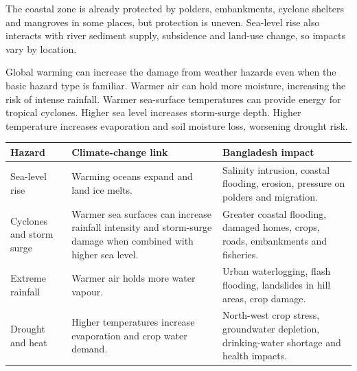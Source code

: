 \documentclass[11pt,a4paper]{article}
\begin{document}
The coastal zone is already protected by polders, embankments, cyclone shelters and mangroves in some places, but protection is uneven. Sea-level rise also interacts with river sediment supply, subsidence and land-use change, so impacts vary by location.

\begin{center}
\end{center}

Global warming can increase the damage from weather hazards even when the basic hazard type is familiar. Warmer air can hold more moisture, increasing the risk of intense rainfall. Warmer sea-surface temperatures can provide energy for tropical cyclones. Higher sea level increases storm-surge depth. Higher temperature increases evaporation and soil moisture loss, worsening drought risk.

\begin{longtable}{p{3.6cm}p{5.7cm}p{5.3cm}}
\toprule
\textbf{Hazard} & \textbf{Climate-change link} & \textbf{Bangladesh impact}\\
\midrule
Sea-level rise & Warming oceans expand and land ice melts. & Salinity intrusion, coastal flooding, erosion, pressure on polders and migration.\\
Cyclones and storm surge & Warmer sea surfaces can increase rainfall intensity and storm-surge damage when combined with higher sea level. & Greater coastal flooding, damaged homes, crops, roads, embankments and fisheries.\\
Extreme rainfall & Warmer air holds more water vapour. & Urban waterlogging, flash flooding, landslides in hill areas, crop damage.\\
Drought and heat & Higher temperatures increase evaporation and crop water demand. & North-west crop stress, groundwater depletion, drinking-water shortage and health impacts.\\
\bottomrule
\end{longtable}
\end{document}
